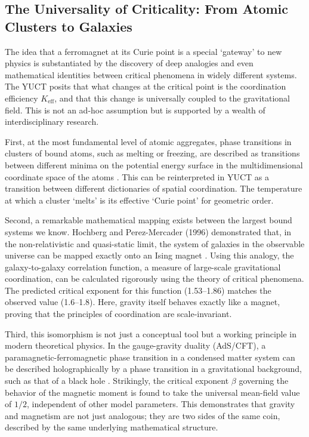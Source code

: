 \documentclass[12pt]{article}
\theoremstyle{remark}
\begin{document}
	
	\subsection{The Universality of Criticality: From Atomic Clusters to Galaxies}
	\label{subsec:universality}
	
	The idea that a ferromagnet at its Curie point is a special `gateway' to new physics is
	substantiated by the discovery of deep analogies and even mathematical identities between
	critical phenomena in widely different systems. The YUCT posits that what changes at the
	critical point is the coordination efficiency \(K_{\mathrm{eff}}\), and that this change is
	universally coupled to the gravitational field. This is not an ad-hoc assumption but is
	supported by a wealth of interdisciplinary research.
	
	First, at the most fundamental level of atomic aggregates, phase transitions in clusters
	of bound atoms, such as melting or freezing, are described as transitions between different
	minima on the potential energy surface in the multidimensional coordinate space of the atoms
	\cite{Berry2005}. This can be reinterpreted in YUCT as a transition between different
	dictionaries of spatial coordination. The temperature at which a cluster `melts' is its
	effective `Curie point' for geometric order.
	
	Second, a remarkable mathematical mapping exists between the largest bound systems we know.
	Hochberg and Perez-Mercader (1996) demonstrated that, in the non-relativistic and
	quasi-static limit, the system of galaxies in the observable universe can be mapped exactly
	onto an Ising magnet \cite{Hochberg1996}. Using this analogy, the galaxy-to-galaxy correlation
	function, a measure of large-scale gravitational coordination, can be calculated rigorously
	using the theory of critical phenomena. The predicted critical exponent for this function
	(1.53--1.86) matches the observed value (1.6--1.8). Here, gravity itself behaves exactly like a
	magnet, proving that the principles of coordination are scale-invariant.
	
	Third, this isomorphism is not just a conceptual tool but a working principle in modern
	theoretical physics. In the gauge-gravity duality (AdS/CFT), a paramagnetic-ferromagnetic
	phase transition in a condensed matter system can be described holographically by a phase
	transition in a gravitational background, such as that of a black hole
	\cite{Ghotbabadi2021, Zbl2021}. Strikingly, the critical exponent \(\beta\) governing the
	behavior of the magnetic moment is found to take the universal mean-field value of \(1/2\),
	independent of other model parameters. This demonstrates that gravity and magnetism are not
	just analogous; they are two sides of the same coin, described by the same underlying
	mathematical structure.
	
\end{document}
